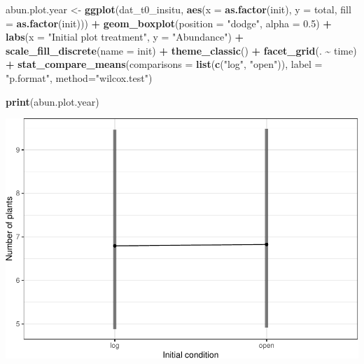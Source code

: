 \documentclass[
]{article}
\newenvironment{Shaded}{\begin{snugshade}}{\end{snugshade}}
\newcommand{\AttributeTok}[1]{\textcolor[rgb]{0.13,0.29,0.53}{#1}}
\newcommand{\FloatTok}[1]{\textcolor[rgb]{0.00,0.00,0.81}{#1}}
\newcommand{\FunctionTok}[1]{\textcolor[rgb]{0.13,0.29,0.53}{\textbf{#1}}}
\newcommand{\NormalTok}[1]{#1}
\newcommand{\OtherTok}[1]{\textcolor[rgb]{0.56,0.35,0.01}{#1}}
\newcommand{\SpecialCharTok}[1]{\textcolor[rgb]{0.81,0.36,0.00}{\textbf{#1}}}
\newcommand{\StringTok}[1]{\textcolor[rgb]{0.31,0.60,0.02}{#1}}
\begin{document}
\begin{Shaded}
\begin{Highlighting}[]
\NormalTok{abun.plot.year }\OtherTok{\textless{}{-}} \FunctionTok{ggplot}\NormalTok{(dat\_t0\_insitu, }\FunctionTok{aes}\NormalTok{(}\AttributeTok{x =} \FunctionTok{as.factor}\NormalTok{(init), }\AttributeTok{y =}\NormalTok{ total, }\AttributeTok{fill =} \FunctionTok{as.factor}\NormalTok{(init))) }\SpecialCharTok{+}
  \FunctionTok{geom\_boxplot}\NormalTok{(}\AttributeTok{position =} \StringTok{"dodge"}\NormalTok{, }\AttributeTok{alpha =} \FloatTok{0.5}\NormalTok{) }\SpecialCharTok{+}
  \FunctionTok{labs}\NormalTok{(}\AttributeTok{x =} \StringTok{"Initial plot treatment"}\NormalTok{,}
       \AttributeTok{y =} \StringTok{"Abundance"}\NormalTok{) }\SpecialCharTok{+}
  \FunctionTok{scale\_fill\_discrete}\NormalTok{(}\AttributeTok{name =} \StringTok{\textquotesingle{}init\textquotesingle{}}\NormalTok{) }\SpecialCharTok{+}
  \FunctionTok{theme\_classic}\NormalTok{() }\SpecialCharTok{+}
  \FunctionTok{facet\_grid}\NormalTok{(. }\SpecialCharTok{\textasciitilde{}}\NormalTok{ time) }\SpecialCharTok{+} 
  \FunctionTok{stat\_compare\_means}\NormalTok{(}\AttributeTok{comparisons =} \FunctionTok{list}\NormalTok{(}\FunctionTok{c}\NormalTok{(}\StringTok{"log"}\NormalTok{, }\StringTok{"open"}\NormalTok{)), }\AttributeTok{label =} \StringTok{"p.format"}\NormalTok{, }\AttributeTok{method=}\StringTok{"wilcox.test"}\NormalTok{)}

\FunctionTok{print}\NormalTok{(abun.plot.year)}
\end{Highlighting}
\end{Shaded}

\includegraphics{log-project-aubrie-winnie_files/figure-latex/unnamed-chunk-1-1.pdf}
\end{document}
